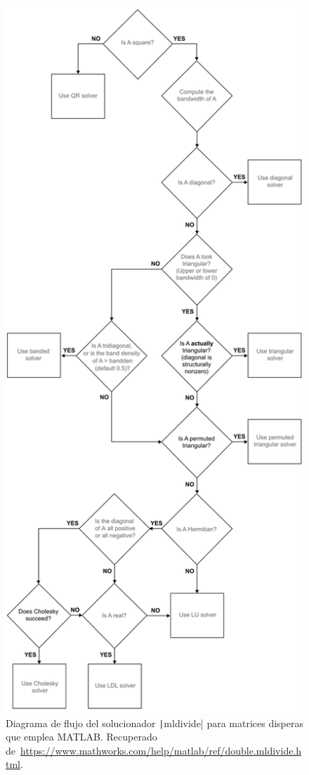 \begin{problem}
\begin{itemize}
        \begin{figure}[ht!]
          \centering
          \includegraphics[width=.3\paperwidth]{mldivide_sparse}
          \caption{Diagrama de flujo del solucionador
            \texttt|mldivide| para matrices
            disperas que emplea MATLAB.
            Recuperado de~\url{https://www.mathworks.com/help/matlab/ref/double.mldivide.html}.}
        \end{figure}
\end{itemize}


\end{problem}
